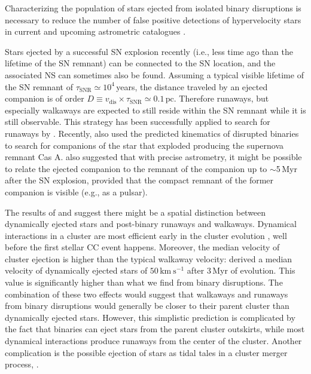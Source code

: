 \documentclass{aa}
\begin{document}
Characterizing the population of stars ejected from isolated binary
disruptions is necessary to reduce the number of false positive detections of hypervelocity stars in current and
upcoming astrometric catalogues \citep[e.g.,][]{marchetti:17b}.


Stars ejected by a successful SN explosion recently (i.e., less time
ago than the lifetime of the SN remnant) can be connected to the SN
location, and the associated NS can sometimes also be found. Assuming
a typical visible lifetime of the SN remnant of
$\tau_\mathrm{SNR} \simeq10^4$\,years, the distance traveled by
an ejected companion is of order $D\equiv
v_\mathrm{dis}\times\tau_\mathrm{SNR}\simeq
0.1\,\mathrm{pc}$. Therefore runaways, but especially walkaways
are expected to
still reside within the SN remnant while it is still observable. This
strategy has been successfully applied to search for runaways by
\cite{vandenbergh:80,guseinov:05,tetzlaff:13,tetzlaff:14,dincel:15,boubert:17a}. Recently,
\cite{kerzendorf:17} also used the predicted kinematics of disrupted
binaries to search for companions of the star that exploded producing
the supernova remnant Cas A. \cite{tetzlaff:11} also suggested that
with precise astrometry, it might be possible to relate the ejected
companion to the remnant of the companion up to $\sim$5\,Myr after the
SN explosion, provided that the compact remnant of the former companion is visible (e.g., as a pulsar).


The results of \cite{banerjee:12} and \cite{perets:12} suggest there
might be a spatial distinction between dynamically ejected stars and
post-binary runaways and walkaways. Dynamical interactions in a
cluster are most efficient early in the cluster evolution \citep[e.g.,][]{oh:16},
well before the first stellar CC event happens. Moreover, the median velocity
of cluster ejection is higher than the typical walkaway
velocity: \cite{banerjee:12} derived 
a median velocity of dynamically ejected stars of
$50\,\mathrm{km\ s^{-1}}$ after 3\,Myr of evolution. This value
 is significantly higher than what we find from binary disruptions. 
The combination of these two effects would suggest that
walkaways and runaways from binary disruptions would generally be closer to their parent cluster than
dynamically ejected stars. However, this simplistic prediction is
complicated by the fact that binaries can eject stars from the parent
cluster outskirts, while most dynamical interactions produce runaways
from the center of the cluster. Another complication is the possible
ejection of stars as tidal tales in a cluster merger process, \citep[e.g.,][]{lucas:17}.
\end{document}
